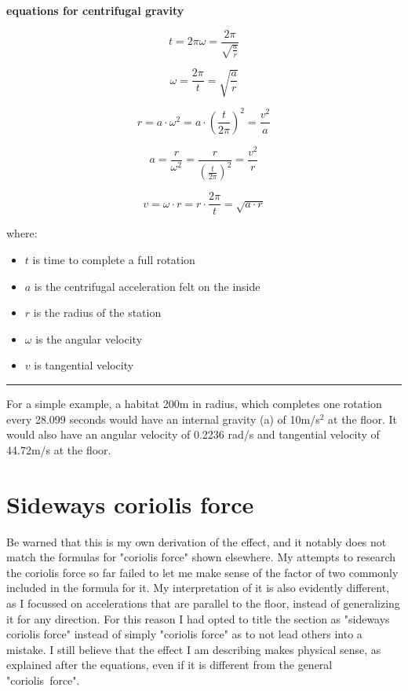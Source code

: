 \documentclass[a4paper]{article}
\begin{document}
	\begin{center}
		\textbf{equations for centrifugal gravity}
	\end{center}
	
	$$ t = 2\pi\omega = \frac{2 \pi}{\sqrt{\frac{a}{r}}} $$
	
	$$ \omega = \frac{2 \pi}{t} = \sqrt{\frac{a}{r}} $$
	
	$$ r = a \cdot \omega^2 = a \cdot \left( \frac{t}{2 \pi} \right)^2 = \frac{v^2}{a}$$
	
	$$ a = \frac{r}{\omega^2} = \frac{r}{\left( \frac{t}{2 \pi} \right)^2} = \frac{v^2}{r}$$
	
	$$ v = \omega \cdot r = r \cdot \frac{2 \pi}{t} = \sqrt{a \cdot r}$$
	
	where:
	
	\begin{itemize}
		\item $t$ is time to complete a full rotation
		
		\item $a$ is the centrifugal acceleration felt on the inside
		
		\item $r$ is the radius of the station
		
		\item $\omega$ is the angular velocity
		
		\item $v$ is tangential velocity
	\end{itemize}
	
	\medskip
	
	\noindent \rule{\linewidth}{1pt}
	
	\medskip
	
	For a simple example, a habitat 200m in radius, which completes one rotation every 28.099 seconds would have an internal gravity (a) of 10m/s$^2$ at the floor. It would also have an angular velocity of 0.2236 rad/s and tangential velocity of 44.72m/s at the floor.
	
	\pagebreak
	
	\section{Sideways coriolis force}
	
	Be warned that this is my own derivation of the effect, and it notably does not match the formulas for "coriolis force" shown elsewhere. My attempts to research the coriolis force so far failed to let me make sense of the factor of two commonly included in the formula for it. My interpretation of it is also evidently different, as I focussed on accelerations that are parallel to the floor, instead of generalizing it for any direction. For this reason I had opted to title the section as "sideways coriolis force" instead of simply "coriolis force" as to not lead others into a mistake. I still believe that the effect I am describing makes physical sense, as explained after the equations, even if it is different from the general "coriolis~force".
	
\end{document}
